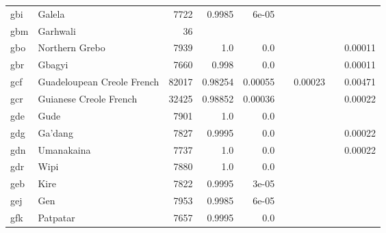 \documentclass[11pt]{article}
\begin{document}
\begin{table*}[h]
{\begin{tabular}{llrrrrrrr}
gbi         & Galela         & 7722         & 0.9985         & 6e-05         &          &          &          &          \\

gbm         & Garhwali         & 36         &          &          &          &          &          &          \\

gbo         & Northern Grebo         & 7939         & 1.0         & 0.0         &          &          &          & 0.00011         \\

gbr         & Gbagyi         & 7660         & 0.998         & 0.0         &          &          &          & 0.00011         \\

gcf         & Guadeloupean Creole French         & 82017         & 0.98254         & 0.00055         &          & 0.00023         &          & 0.00471         \\

gcr         & Guianese Creole French         & 32425         & 0.98852         & 0.00036         &          &          &          & 0.00022         \\

gde         & Gude         & 7901         & 1.0         & 0.0         &          &          &          &          \\

gdg         & Ga'dang         & 7827         & 0.9995         & 0.0         &          &          &          & 0.00022         \\

gdn         & Umanakaina         & 7737         & 1.0         & 0.0         &          &          &          & 0.00022         \\

gdr         & Wipi         & 7880         & 1.0         & 0.0         &          &          &          &          \\

geb         & Kire         & 7822         & 0.9995         & 3e-05         &          &          &          &          \\

gej         & Gen         & 7953         & 0.9985         & 6e-05         &          &          &          &          \\

gfk         & Patpatar         & 7657         & 0.9995         & 0.0         &          &          &          &          \\


\end{tabular}}
\end{table*}
\end{document}
